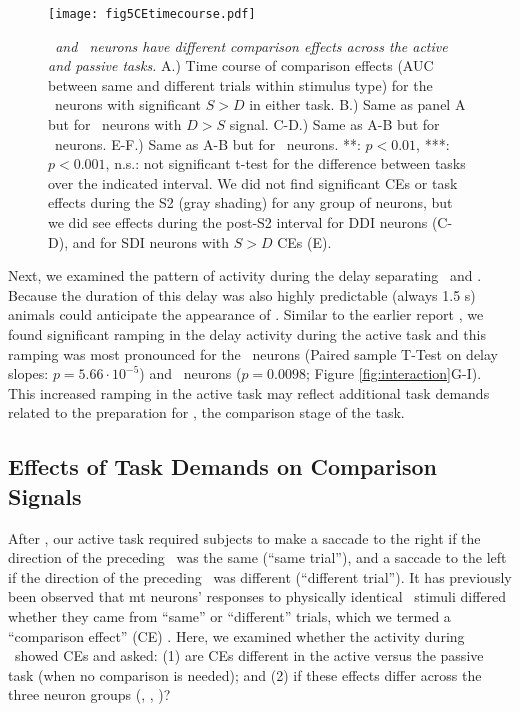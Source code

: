 	\begin{figure}
		\captionsetup{singlelinecheck = false, font=footnotesize, labelsep=space}
		\centering
		\texttt{[image: fig5CEtimecourse.pdf]}
		\caption{{\it \suppressed\ and \consistent\ neurons have different comparison effects across the active and passive tasks.} A.) Time course of comparison effects (AUC between same and different trials within stimulus type) for the \enhanced\ neurons with significant $S>D$ in either task. B.) Same as panel A but for \enhanced\ neurons with $D>S$ signal. C-D.) Same as A-B but for \suppressed\ neurons. E-F.) Same as A-B but for \consistent\ neurons. **: $p<0.01$, ***: $p<0.001$, n.s.: not significant t-test for the difference between tasks over the indicated interval. We did not find significant CEs or task effects during the S2 (gray shading) for any group of neurons, but we did see effects during the post-S2 interval for DDI neurons (C-D), and for SDI neurons with $S>D$ CEs (E). }
		\label{fig:CEtimecourses}
	\end{figure}
	\addtocounter{page}{-1}
	\thispagestyle{empty}
	\clearpage


Next, we examined the pattern of activity during the delay separating \sample\ and \test. Because the duration of this delay was also highly predictable (always 1.5 s) animals could anticipate the appearance of \test.
Similar to the earlier report \parencite{Bisley2004}, we found significant ramping in the delay activity during the active task and this ramping was most pronounced for the \enhanced\ neurons (Paired sample T-Test on delay slopes: $p=5.66\cdot10^{-5}$) and \consistent\ neurons ($p=0.0098$; Figure \ref{fig:interaction}G-I).  This increased ramping in the active task may reflect additional task demands related to the preparation for \test, the comparison stage of the task.

\subsection*{Effects of Task Demands on Comparison Signals}
After \test, our active task required subjects to make a saccade to the right if the direction of the preceding \sample\ was the same (``same trial''), and a saccade to the left if the direction of the preceding \sample\ was different (``different trial''). It has previously been observed that \gls{mt} neurons' responses to physically identical \test\ stimuli differed whether they came from ``same'' or ``different'' trials, which we termed a ``comparison effect'' (CE)  \parencite{Lui2011,Zaksas2006}. 
Here, we examined whether the activity during \test\ showed CEs and asked: (1) are CEs different in the active versus the passive task (when no comparison is needed); and (2) if these effects differ across the three neuron groups (\enhanced, \suppressed, \consistent)?

